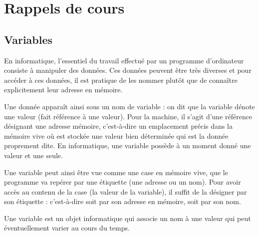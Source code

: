 
\section{Rappels de cours}\label{affectation:cours}

\subsection{Variables}\label{affectation:cours:variables}

En informatique, l'essentiel du travail effectué par un programme d'ordinateur consiste 
à manipuler des données. Ces données peuvent être très diverses et
pour accéder à ces données, il est pratique de les nommer plutôt que de connaître
explicitement leur adresse en mémoire. 

Une donnée apparaît ainsi sous un nom de variable :
on dit que la variable dénote une valeur (fait référence à une valeur).
Pour la machine, il s'agit d'une référence 
désignant une adresse mémoire, c'est-à-dire un emplacement précis dans 
la mémoire vive où est stockée une valeur bien déterminée qui est la donnée 
proprement dite.
En informatique, une variable possède à un moment donné une valeur et une seule.

Une variable peut ainsi être vue comme une case en mémoire vive, que le programme 
va repérer par une étiquette (une adresse ou un nom). Pour avoir accès au contenu de la case
(la valeur de la variable), il suffit de la désigner par son étiquette : c'est-à-dire 
soit par son adresse en mémoire, soit par son nom.

\begin{definition}[variable]
Une variable est un objet informatique qui associe un nom à une valeur 
qui peut éventuellement varier au cours du temps.
\end{definition}

